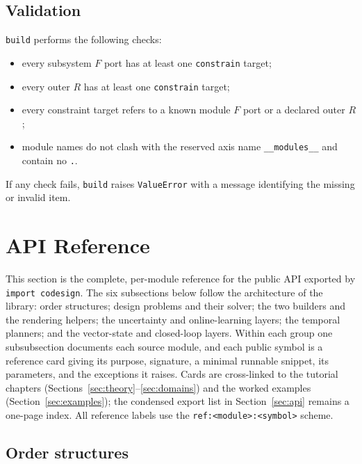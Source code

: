 \documentclass[11pt,a4paper]{article}
\begin{document}
\subsection{Validation}

\texttt{build} performs the following checks:
\begin{itemize}[leftmargin=2em]
  \item every subsystem $F$ port has at least one \texttt{constrain}
        target;
  \item every outer $R$ has at least one \texttt{constrain} target;
  \item every constraint target refers to a known module $F$ port or a
        declared outer $R$;
  \item module names do not clash with the reserved axis name
        \texttt{\_\_modules\_\_} and contain no \texttt{.}.
\end{itemize}
If any check fails, \texttt{build} raises \texttt{ValueError} with a
message identifying the missing or invalid item.

\section{API Reference}
\label{sec:apiref}

This section is the complete, per-module reference for the public API
exported by \texttt{import codesign}. The six subsections below follow the
architecture of the library: order structures; design problems and their
solver; the two builders and the rendering helpers; the uncertainty and
online-learning layers; the temporal planners; and the vector-state and
closed-loop layers. Within each group one subsubsection documents each
source module, and each public symbol is a reference card giving its
purpose, signature, a minimal runnable snippet, its parameters, and the
exceptions it raises. Cards are cross-linked to the tutorial chapters
(Sections~\ref{sec:theory}--\ref{sec:domains}) and the worked examples
(Section~\ref{sec:examples}); the condensed export list in
Section~\ref{sec:api} remains a one-page index. All reference labels use
the \texttt{ref:<module>:<symbol>} scheme.

\subsection{Order structures}
\end{document}
